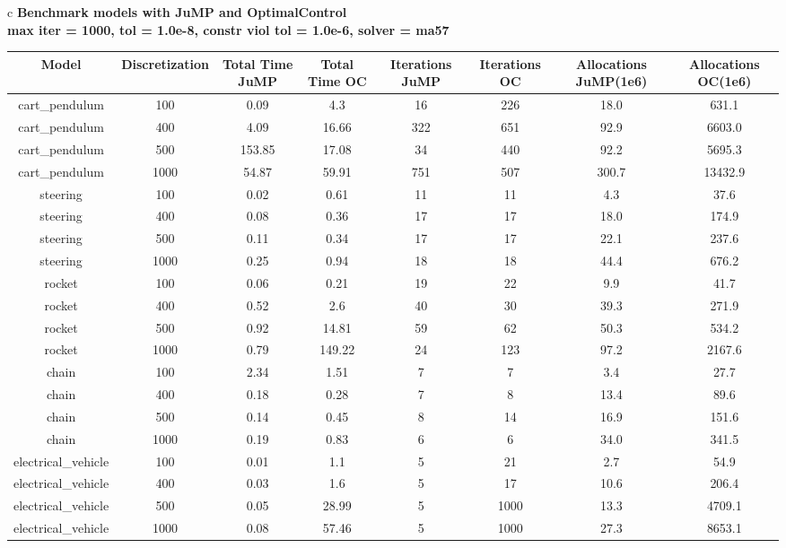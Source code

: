 \documentclass{standalone}
\begin{document}
\begin{tabular}{c}
\Large\textbf{Benchmark models with JuMP and OptimalControl}\\
\large\textbf{max iter = 1000, tol = 1.0e-8, constr viol tol = 1.0e-6, solver = ma57}\\
\begin{tabular}{cccccccc}
  \hline
  \textbf{Model} & \textbf{Discretization} & \textbf{Total Time JuMP} & \textbf{Total Time OC} & \textbf{Iterations JuMP} & \textbf{Iterations OC} & \textbf{Allocations JuMP(1e6)} & \textbf{Allocations OC(1e6)} \\\hline
  cart\_pendulum & 100 & 0.09 & 4.3 & 16 & 226 & 18.0 & 631.1 \\
  cart\_pendulum & 400 & 4.09 & 16.66 & 322 & 651 & 92.9 & 6603.0 \\
  cart\_pendulum & 500 & 153.85 & 17.08 & 34 & 440 & 92.2 & 5695.3 \\
  cart\_pendulum & 1000 & 54.87 & 59.91 & 751 & 507 & 300.7 & 13432.9 \\
  steering & 100 & 0.02 & 0.61 & 11 & 11 & 4.3 & 37.6 \\
  steering & 400 & 0.08 & 0.36 & 17 & 17 & 18.0 & 174.9 \\
  steering & 500 & 0.11 & 0.34 & 17 & 17 & 22.1 & 237.6 \\
  steering & 1000 & 0.25 & 0.94 & 18 & 18 & 44.4 & 676.2 \\
  rocket & 100 & 0.06 & 0.21 & 19 & 22 & 9.9 & 41.7 \\
  rocket & 400 & 0.52 & 2.6 & 40 & 30 & 39.3 & 271.9 \\
  rocket & 500 & 0.92 & 14.81 & 59 & 62 & 50.3 & 534.2 \\
  rocket & 1000 & 0.79 & 149.22 & 24 & 123 & 97.2 & 2167.6 \\
  chain & 100 & 2.34 & 1.51 & 7 & 7 & 3.4 & 27.7 \\
  chain & 400 & 0.18 & 0.28 & 7 & 8 & 13.4 & 89.6 \\
  chain & 500 & 0.14 & 0.45 & 8 & 14 & 16.9 & 151.6 \\
  chain & 1000 & 0.19 & 0.83 & 6 & 6 & 34.0 & 341.5 \\
  electrical\_vehicle & 100 & 0.01 & 1.1 & 5 & 21 & 2.7 & 54.9 \\
  electrical\_vehicle & 400 & 0.03 & 1.6 & 5 & 17 & 10.6 & 206.4 \\
  electrical\_vehicle & 500 & 0.05 & 28.99 & 5 & 1000 & 13.3 & 4709.1 \\
  electrical\_vehicle & 1000 & 0.08 & 57.46 & 5 & 1000 & 27.3 & 8653.1 \\\hline
\end{tabular}
\end{tabular}
\end{document}
